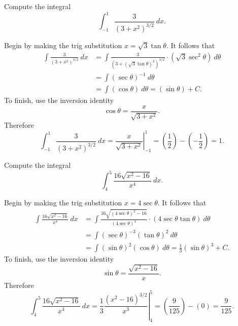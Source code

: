 \documentclass{ximera}
\begin{document}
\begin{question}%

Compute the integral 
\[\int_{-1}^{1}\frac{3}{(3+x^2)^{3/2}}~dx.\]
\begin{multiplechoice}
\end{multiplechoice}
\begin{feedback}
Begin by making the trig substitution \(x=\sqrt{3}\tan \theta\). It follows that 
\[ \begin{aligned} \int\frac{3}{(3+x^2)^{3/2}}~dx & = \int \frac{3}{(3+(\sqrt{3}\tan \theta)^2)^{3/2}} \cdot (\sqrt{3}\sec^2 \theta)~d \theta \\
 & = \int (\sec \theta)^{-1}~d \theta \\ & = \int (\cos \theta) ~ d \theta = (\sin \theta) + C. \end{aligned} \]
To finish, use the inversion identity \[\cos \theta = \frac{x}{\sqrt{3+x^2}}.\]
Therefore \[\int_{-1}^{1}\frac{3}{(3+x^2)^{3/2}}~dx = \left.\frac{x}{\sqrt{3+x^2}}\right|_{-1}^{1} = \left(\frac{1}{2}\right) - \left(-\frac{1}{2}\right) = 1.\]
\end{feedback}

\end{question}

\begin{question}%

Compute the integral 
\[\int_{4}^{5}\frac{16\sqrt{x^2-16}}{x^{4}}~dx.\]
\begin{multiplechoice}
\end{multiplechoice}
\begin{feedback}
Begin by making the trig substitution \(x=4\sec \theta\). It follows that 
\[ \begin{aligned} \int\frac{16\sqrt{x^2-16}}{x^{4}}~dx & = \int \frac{16\sqrt{(4\sec \theta)^2-16}}{(4\sec \theta)^{4}} \cdot (4\sec \theta\tan \theta)~d \theta \\
 & = \int (\sec \theta)^{-3}(\tan \theta)^{2}~d \theta \\ & = \int (\sin \theta)^{2}(\cos \theta) ~ d \theta = \frac{1}{3}(\sin \theta)^{3} + C. \end{aligned} \]
To finish, use the inversion identity \[\sin \theta = \frac{\sqrt{x^2-16}}{x}.\]
Therefore \[\int_{4}^{5}\frac{16\sqrt{x^2-16}}{x^{4}}~dx = \left.\frac{1}{3}\frac{(x^2-16)^{3/2}}{x^{3}}\right|_{4}^{5} = \left(\frac{9}{125}\right) - \left(0\right) = \frac{9}{125}.\]
\end{feedback}

\end{question}
\end{document}
